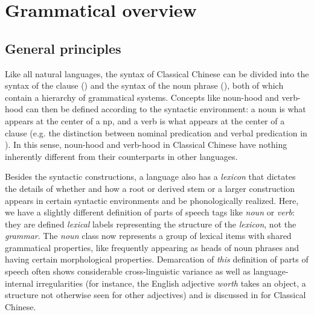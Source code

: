 \documentclass[UTF8, a4paper, oneside, scheme=plain, 12pt]{ctexrep}
\newcommand*{\term}[1]{\emph{#1}}
\newcommand{\form}[1]{\emph{#1}}
\begin{document}
\chapter{Grammatical overview}\label{chap:grammatical}

\section{General principles}\label{sec:grammatical.intro}

Like all natural languages, the syntax of Classical Chinese can be divided into 
the syntax of the clause () and the syntax of the noun phrase (),
both of which contain a hierarchy of grammatical systems.
Concepts like noun-hood and verb-hood can then be defined according to the syntactic environment:
a noun is what appears at the center of a \ac{np},
and a verb is what appears at the center of a clause
(e.g. the distinction between nominal predication and verbal predication 
in ).
In this sense, noun-hood and verb-hood in Classical Chinese have nothing inherently different from their counterparts in other languages.

Besides the syntactic constructions, 
a language also has a \emph{lexicon} that dictates 
the details of whether and how a root or derived stem or a larger construction appears
in certain syntactic environments and be phonologically realized.
Here, we have a slightly different definition of 
parts of speech tags like \term{noun} or \term{verb}:
they are defined \emph{lexical} labels 
representing the structure of the \emph{lexicon}, not the \emph{grammar}.
The \term{noun} class now represents a group of lexical items with shared grammatical properties,
like frequently appearing as heads of noun phrases and having certain morphological properties.
Demarcation of \emph{this} definition of parts of speech often shows considerable cross-linguistic variance as well as language-internal irregularities (for instance, the English adjective \form{worth} takes an object, a structure not otherwise seen for other adjectives) and is discussed in  for Classical Chinese.
\end{document}
